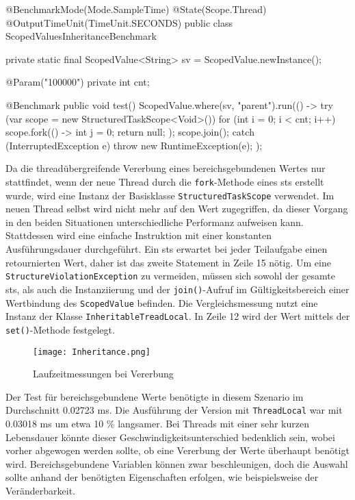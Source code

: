     \begin{program} [H]
        \caption{Laufzeit bei Vererbung}
        \label{prog:Inheritance}
    \begin{JavaCode}[language=Java, numbers=left]
@BenchmarkMode(Mode.SampleTime)
@State(Scope.Thread)
@OutputTimeUnit(TimeUnit.SECONDS)
public class ScopedValuesInheritanceBenchmark {
    private static final ScopedValue<String> sv = ScopedValue.newInstance();

    @Param({"100000"})
    private int cnt;

    @Benchmark
    public void test(){
        ScopedValue.where(sv, "parent").run(() -> {
            try (var scope = new StructuredTaskScope<Void>()) {
                for (int i = 0; i < cnt; i++) 
                    scope.fork(() -> {int j = 0; return null; });
                scope.join();
            } catch (InterruptedException e) {
                throw new RuntimeException(e);
            }
        });
    }
}\end{JavaCode}
    \end{program}
    Da die threadübergreifende Vererbung eines bereichsgebundenen Wertes nur stattfindet, wenn der neue Thread durch die \texttt{fork}-Methode eines \gls{sts} erstellt wurde, wird eine Instanz 
    der Basisklasse \texttt{StructuredTaskScope} verwendet. Im neuen Thread selbst wird nicht mehr auf
    den Wert zugegriffen, da dieser Vorgang in den beiden Situationen unterschiedliche Performanz aufweisen kann. Stattdessen wird eine einfache Instruktion mit einer konstanten Ausführungsdauer
    durchgeführt. Ein \gls{sts} erwartet bei jeder Teilaufgabe einen retournierten Wert, daher ist das zweite Statement in Zeile 15 nötig. Um eine \texttt{StructureViolationException} zu vermeiden,
    müssen sich sowohl der gesamte \gls{sts}, als auch die Instanziierung und der \texttt{join()}-Aufruf im Gültigkeitsbereich einer Wertbindung des \texttt{ScopedValue} befinden.
    Die Vergleichsmessung
    nutzt eine Instanz der Klasse \texttt{InheritableTreadLocal}. In Zeile 12 wird der Wert mittels der \texttt{set()}-Methode festgelegt.

    \begin{figure}[H]
        \centering
        \texttt{[image: Inheritance.png]}
        \caption{Laufzeitmessungen bei Vererbung}
        \label{fig:inheritance}
    \end{figure}

    Der Test für bereichsgebundene Werte benötigte in diesem Szenario im Durchschnitt 0.02723 ms. Die Ausführung der Version mit \texttt{ThreadLocal} war mit 0.03018 ms um etwa 10 \% langsamer. 
    Bei Threads mit einer sehr kurzen Lebensdauer könnte dieser Geschwindigkeitsunterschied bedenklich sein, wobei vorher abgewogen werden sollte, ob eine Vererbung der Werte überhaupt 
    benötigt wird. Bereichsgebundene Variablen können zwar beschleunigen, doch die Auswahl sollte anhand der benötigten Eigenschaften erfolgen, wie beispielsweise der Veränderbarkeit.

